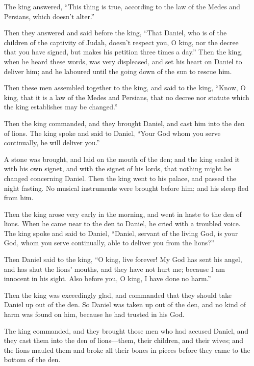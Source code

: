 The king answered, ``This thing is true, according to the law of the
Medes and Persians, which doesn't alter.''

 Then they answered and said before the king, ``That
Daniel, who is of the children of the captivity of Judah, doesn't
respect you, O king, nor the decree that you have signed, but makes his
petition three times a day.''  Then the king, when he heard
these words, was very displeased, and set his heart on Daniel to deliver
him; and he laboured until the going down of the sun to rescue him.

 Then these men assembled together to the king, and said to
the king, ``Know, O king, that it is a law of the Medes and Persians,
that no decree nor statute which the king establishes may be changed.''

 Then the king commanded, and they brought Daniel, and cast
him into the den of lions. The king spoke and said to Daniel, ``Your God
whom you serve continually, he will deliver you.''

 A stone was brought, and laid on the mouth of the den; and
the king sealed it with his own signet, and with the signet of his
lords, that nothing might be changed concerning Daniel. 
Then the king went to his palace, and passed the night fasting. No
musical instruments were brought before him; and his sleep fled from
him.

 Then the king arose very early in the morning, and went in
haste to the den of lions.  When he came near to the den to
Daniel, he cried with a troubled voice. The king spoke and said to
Daniel, ``Daniel, servant of the living God, is your God, whom you serve
continually, able to deliver you from the lions?''

 Then Daniel said to the king, ``O king, live forever!
 My God has sent his angel, and has shut the lions' mouths,
and they have not hurt me; because I am innocent in his sight. Also
before you, O king, I have done no harm.''

 Then the king was exceedingly glad, and commanded that
they should take Daniel up out of the den. So Daniel was taken up out of
the den, and no kind of harm was found on him, because he had trusted in
his God.

 The king commanded, and they brought those men who had
accused Daniel, and they cast them into the den of lions---them, their
children, and their wives; and the lions mauled them and broke all their
bones in pieces before they came to the bottom of the den.

